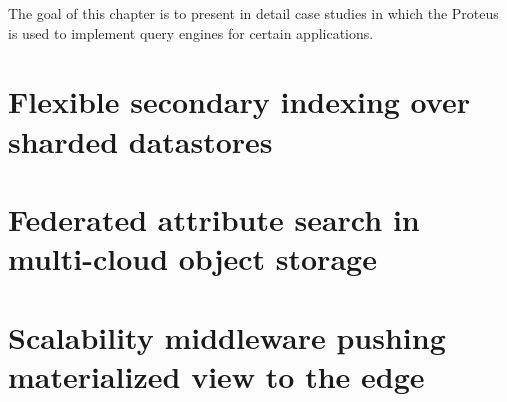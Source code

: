 The goal of this chapter is to present in detail case studies in which the
Proteus is used to implement query engines for certain applications.

\section{Flexible secondary indexing over sharded datastores}

\section{Federated attribute search in multi-cloud object storage}

\section{Scalability middleware pushing materialized view to the edge}